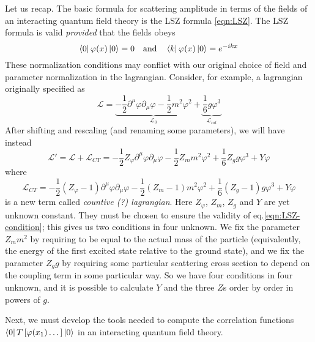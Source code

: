 \documentclass[../main/main.tex]{subfiles}
\let\temp\phi
\let\phi\varphi
\let\varphi\temp
\begin{document}
Let us recap. The basic formula for scattering amplitude in terms of the fields of an interacting quantum field theory is the LSZ formula \eqref{eqn:LSZ}. The LSZ formula is valid \emph{provided} that the fields obeys
\begin{equation}\label{eqn:LSZ-condition}
\bra0\phi(x)\ket0=0\quad\text{and}\quad\bra k\phi(x)\ket0=e^{-ikx}
\end{equation}
These normalization conditions may conflict with our original choice of field and parameter normalization in the lagrangian. Consider, for example, a lagrangian originally specified as
\[\mathcal L=\underbrace{-\frac12\partial^\mu\phi\partial_\mu\phi-\frac12m^2\phi^2}_{\mathcal L_0}+\underbrace{\frac16g\phi^3}_{\mathcal L_{int}}\]
After shifting and rescaling (and renaming some parameters), we will have instead
\[\mathcal L'=\mathcal L+\mathcal L_{CT}=-\frac12Z_\phi\partial^\mu\phi\partial_\mu\phi-\frac12Z_mm^2\phi^2+\frac16Z_gg\phi^3+Y\phi\]
where
\[\mathcal L_{CT}=-\frac12(Z_\phi-1)\partial^\mu\phi\partial_\mu\phi-\frac12(Z_m-1)m^2\phi^2+\frac16(Z_g-1)g\phi^3+Y\phi\]
is a new term called \emph{countive (?) lagrangian}.
 Here $Z_\phi$, $Z_m$, $Z_g$ and $Y$ are yet unknown constant. They must be chosen to ensure the validity of eq.\eqref{eqn:LSZ-condition}; this gives us two conditions in four unknown. We fix the parameter $Z_mm^2$ by requiring  to be equal to the actual mass of the particle (equivalently, the energy of the first excited state relative to the ground state), and we fix the parameter $Z_gg$ by requiring some particular scattering cross section to depend on the coupling term in some particular way. So we have four conditions in four unknown, and it is possible to calculate $Y$ and the three $Z$s order by order in powers of $g$.

Next, we must develop the tools needed to compute the correlation functions $\bra0 T\left[\phi(x_1)\dots\right]\ket0$ in an interacting quantum field theory.
\end{document}
